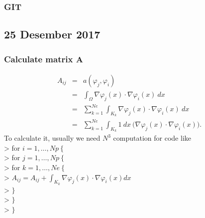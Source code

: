 \documentclass[a4paper,10pt]{article}
\begin{document}
\subsubsection{GIT}

\subsection{25 Desember 2017}

\subsubsection{Calculate matrix $ \mathbf{A}$}
\begin{eqnarray}\nonumber
A_{ij} &=& a(\varphi_{j}, \varphi_{i}) \\ \nonumber
&=& \int_{\Omega} \nabla \varphi_{j}(x) \cdot \nabla \varphi_{i}(x) \ dx \\ \nonumber
&=& \sum_{k=1}^{Ne} \int_{K_{k}} \nabla \varphi_{j}(x) \cdot \nabla \varphi_{i}(x) \ dx \\ \nonumber
&=& \sum_{k=1}^{Ne} \int_{K_{k}} 1 \ dx \ \big( \nabla \varphi_{j}(x) \cdot \nabla \varphi_{i}(x)\big).
\end{eqnarray}
To calculate it, usually we need $ N^3 $ computation for code like \\
\textgreater \hspace{1cm} for $ i=1, \dots, Np \  \{$ \\
\textgreater \hspace{1.5cm} for $ j=1, \dots , Np  \ \{$\\
\textgreater \hspace{2cm} for $ k=1, \dots, Ne \ \{ $  \\
\textgreater \hspace{2.5cm} $ A_{ij} = A_{ij} + \int_{K_{k}} \nabla\varphi_{j}(x) \cdot \nabla \varphi_{i}(x) dx $\\
\textgreater \hspace{2cm} $ \} $ \\
\textgreater \hspace{1.5cm} $ \} $ \\
\textgreater \hspace{1cm} $ \} $
\end{document}
